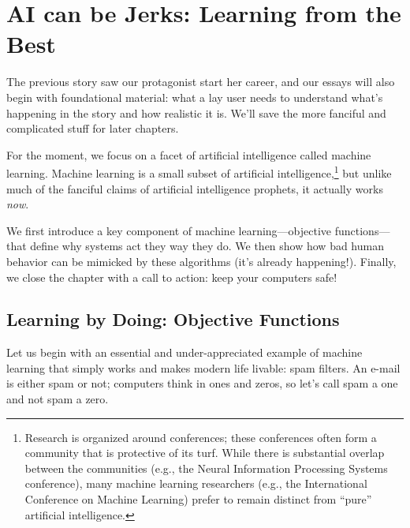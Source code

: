 

\newcommand{\salesjerk}[0]{Levi}

\chapter{AI can be Jerks: Learning from the Best}

The previous story saw our protagonist start her career, and our
essays will also begin with foundational material: what a lay user needs
to understand what's happening in the story and how realistic it is.
We'll save the more fanciful and complicated stuff for later chapters.

For the moment, we focus on a facet of artificial intelligence called
machine learning.  Machine learning is a small subset of artificial
intelligence,\footnote{Research is organized around conferences; these
  conferences often form a community that is protective of its turf.
  While there is substantial overlap between the communities (e.g.,
  the Neural Information Processing Systems conference), many machine
  learning researchers (e.g., the International Conference on Machine
  Learning) prefer to remain distinct from ``pure'' artificial
  intelligence.} but unlike much of the fanciful claims of artificial
intelligence prophets, it actually works \emph{now}.


We first introduce a key component of machine learning---objective
functions---that define why systems act they way they do. We then show
how bad human behavior can be mimicked by these algorithms (it's
already happening!).  Finally, we close the chapter with a call to
action: keep your computers safe!

\section{Learning by Doing: Objective Functions}
\label{sec:objective-functions}

Let us begin with an essential and under-appreciated example of machine
learning that simply works and makes modern life livable: spam
filters.  An e-mail is either spam or not; computers think in ones and
zeros, so let's call spam a one and not spam a zero.

